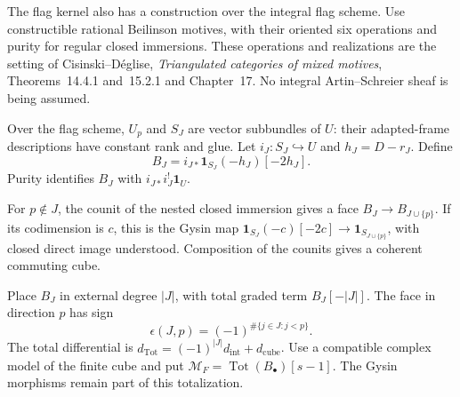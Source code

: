 The flag kernel also has a construction over the integral flag
scheme. Use constructible rational Beilinson motives, with their
oriented six operations and purity for regular closed immersions.
These operations and realizations are the setting of
Cisinski--D\'eglise, \emph{Triangulated categories of mixed motives},
Theorems~14.4.1 and~15.2.1 and Chapter~17.
No integral Artin--Schreier sheaf is being assumed.

Over the flag scheme, $U_p$ and $S_J$ are vector subbundles of
$U$: their adapted-frame descriptions have constant rank and glue.
Let $i_J:S_J\hookrightarrow U$ and $h_J=D-r_J$. Define
\begin{equation}\label{v4-arith:hall:eq:cube-vertices}
 B_J=i_{J*}\mathbf1_{S_J}(-h_J)[-2h_J].
\end{equation}
Purity identifies $B_J$ with $i_{J*}i_J^!\mathbf1_U$.

For $p\notin J$, the counit of the nested closed immersion gives
a face $B_J\to B_{J\cup\{p\}}$.
If its codimension is $c$, this is the Gysin map
$\mathbf1_{S_J}(-c)[-2c]\to\mathbf1_{S_{J\cup\{p\}}}$,
with closed direct image understood.
Composition of the counits gives a coherent commuting cube.

Place $B_J$ in external degree $|J|$, with total graded term
$B_J[-|J|]$. The face in direction $p$ has sign
\[
 \epsilon(J,p)=(-1)^{\#\{j\in J:j<p\}}.
\]
The total differential is
$d_{\mathrm{Tot}}=(-1)^{|J|}d_{\mathrm{int}}+d_{\mathrm{cube}}$.
Use a compatible complex model of the finite cube and put
$\mathcal M_F=\operatorname{Tot}(B_\bullet)[s-1]$.
The Gysin morphisms remain part of this totalization.

